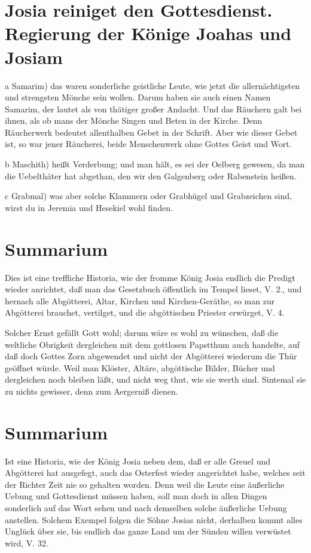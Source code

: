 \section[Josia reiniget den Gottesdienst. Regierung der Könige Joahas]{Josia reiniget den Gottesdienst. Regierung der Könige Joahas und Josiam}

a Samarim) das waren sonderliche geistliche Leute, wie jetzt die allernächtigsten und strengsten Mönche sein wollen. Darum haben sie auch einen Namen Samarim, der lautet als von thätiger großer Andacht. Und das Räuchern galt bei ihnen, als ob mans der Mönche Singen und Beten in der Kirche. Denn Räucherwerk bedeutet allenthalben Gebet in der Schrift. Aber wie dieser Gebet ist, so war jener Räucherei, beide Menschenwerk ohne Gottes Geist und Wort.

b Maschith) heißt Verderbung; und man hält, es sei der Oelberg gewesen, da man die Uebelthäter hat abgethan, den wir den Galgenberg oder Rabenstein heißen.

c Grabmal) was aber solche Klammern oder Grabhügel und Grabzeichen sind, wirst du in Jeremia und Hesekiel wohl finden.

\section{Summarium}

Dies ist eine treffliche Historia, wie der fromme König Josia endlich die Predigt wieder anrichtet, daß man das Gesetzbuch öffentlich im Tempel lieset, V. 2., und hernach alle Abgötterei, Altar, Kirchen und Kirchen-Geräthe, so man zur Abgötterei brauchet, vertilget, und die abgöttischen Priester erwürget, V. 4.

Solcher Ernst gefällt Gott wohl; darum wäre es wohl zu wünschen, daß die weltliche Obrigkeit
 dergleichen mit dem gottlosen Papstthum auch handelte, auf daß doch Gottes Zorn abgewendet und nicht der Abgötterei wiederum die Thür geöffnet würde. Weil man Klöster, Altäre, abgöttische Bilder, Bücher und dergleichen noch bleiben läßt, und nicht weg thut, wie sie werth sind. Sintemal sie zu nichts gewisser, denn zum Aergerniß dienen.

\section{Summarium}

Ist eine Historia, wie der König Josia neben dem, daß er alle Greuel und Abgötterei hat ausgefegt, auch das Osterfest wieder angerichtet habe, welches seit der Richter Zeit nie so gehalten worden. Denn weil die Leute eine äußerliche Uebung und Gottesdienst müssen haben, soll man doch in allen Dingen sonderlich auf das Wort sehen und nach demselben solche äußerliche Uebung anstellen. Solchem Exempel folgen die Söhne Josias nicht, derhalben kommt alles Unglück über sie, bis endlich das ganze Land um der Sünden willen verwüstet wird, V. 32.


